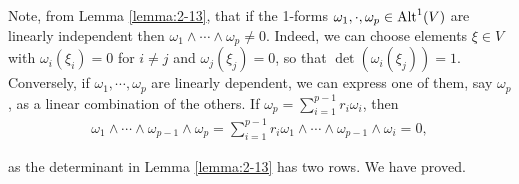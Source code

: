 Note, from Lemma \ref{lemma:2-13}, that if the 1-forms $\omega_1, \cdot, \omega_p\in\operatorname{Alt}^1(V)$ 
are linearly independent then $\omega_1\wedge\cdots\wedge\omega_p\neq 0$. Indeed, we can choose 
elements $\xi\in V$ with $\omega_i(\xi_i) = 0$ for $i\neq j$ and $\omega_j(\xi_j) = 0$, so that 
$\det(\omega_i(\xi_j)) = 1$. Conversely, if $\omega_1, \cdots, \omega_p$ are linearly dependent,
we can express one of them, say $\omega_p$, as a linear combination of the others. If 
$\omega_p = \sum_{i=1}^{p-1}{r_i\omega_i}$, then
\begin{align*}
  \omega_{1}\wedge\cdots\wedge\omega_{p-1}\wedge\omega_{p}
  = \sum_{i=1}^{p-1}r_{i}\omega_{1}\wedge\cdots\wedge\omega_{p-1}\wedge\omega_{i}=0,
\end{align*}

as the determinant in Lemma \ref{lemma:2-13} has two rows. We have proved.